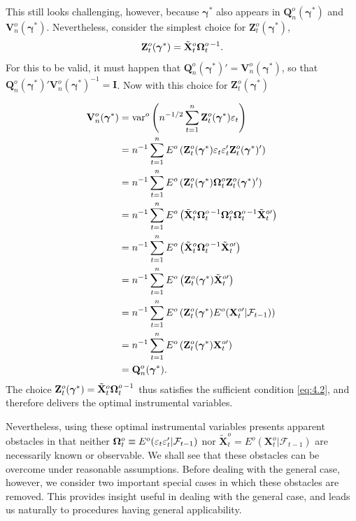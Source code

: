 This still looks challenging, however, because $\boldsymbol{\gamma}^*$ also appears in $\mathbf{Q}_n^o(\boldsymbol{\gamma}^*)$
and $\mathbf{V}_n^o(\boldsymbol{\gamma}^*)$. Nevertheless, consider the simplest choice for $\mathbf{Z}_t^o(\boldsymbol{\gamma}^*)$,
\[
\mathbf{Z}_t^o(\boldsymbol{\gamma}^*) = \tilde{\mathbf{X}}_t^o\boldsymbol{\Omega}_t^{o\,-1}.
\]
For this to be valid, it must happen that $\mathbf{Q}_n^o(\boldsymbol{\gamma}^*)' = \mathbf{V}_n^o(\boldsymbol{\gamma}^*)$, so that
$\mathbf{Q}_n^o(\boldsymbol{\gamma}^*)'\mathbf{V}_n^o(\boldsymbol{\gamma}^*)^{-1} = \mathbf{I}$. Now with this choice for $\mathbf{Z}_t^o(\boldsymbol{\gamma}^*)$

\begin{align*}
\mathbf{V}_n^o(\boldsymbol{\gamma}^*) &= \mathrm{var}^o\left(n^{-1/2}\sum_{t=1}^{n}\mathbf{Z}_t^o(\boldsymbol{\gamma}^*)\varepsilon_t\right) \\
&= n^{-1}\sum_{t=1}^{n}E^o\left(\mathbf{Z}_t^o(\boldsymbol{\gamma}^*)\varepsilon_t\varepsilon_t'\mathbf{Z}_t^o(\boldsymbol{\gamma}^*)'\right) \\
&= n^{-1}\sum_{t=1}^{n}E^o\left(\mathbf{Z}_t^o(\boldsymbol{\gamma}^*)\boldsymbol{\Omega}_t^o\mathbf{Z}_t^o(\boldsymbol{\gamma}^*)'\right) \\
&= n^{-1}\sum_{t=1}^{n}E^o\left(\tilde{\mathbf{X}}_t^o\boldsymbol{\Omega}_t^{o\,-1}\boldsymbol{\Omega}_t^o\boldsymbol{\Omega}_t^{o\,-1}\tilde{\mathbf{X}}_t^{o\prime}\right) \\
&= n^{-1}\sum_{t=1}^{n}E^o\left(\tilde{\mathbf{X}}_t^o\boldsymbol{\Omega}_t^{o\,-1}\tilde{\mathbf{X}}_t^{o\prime}\right) \\
&= n^{-1}\sum_{t=1}^{n}E^o\left(\mathbf{Z}_t^o(\boldsymbol{\gamma}^*)\tilde{\mathbf{X}}_t^{o\prime}\right) \\
&= n^{-1}\sum_{t=1}^{n}E^o\left(\mathbf{Z}_t^o(\boldsymbol{\gamma}^*)E^o(\mathbf{X}_t^{o\prime}|\mathcal{F}_{t-1})\right) \\
&= n^{-1}\sum_{t=1}^{n}E^o\left(\mathbf{Z}_t^o(\boldsymbol{\gamma}^*)\mathbf{X}_t^{o\prime}\right) \\
&= \mathbf{Q}_n^o(\boldsymbol{\gamma}^*).
\end{align*}
The choice $\mathbf{Z}_t^o(\boldsymbol{\gamma}^*) = \tilde{\mathbf{X}}_t^o\boldsymbol{\Omega}_t^{o\,-1}$ thus satisfies the sufficient condition \eqref{eq:4.2},
and therefore delivers the optimal instrumental variables.

Nevertheless, using these optimal instrumental variables presents apparent obstacles in that neither $\boldsymbol{\Omega}_t^o \equiv E^o(\varepsilon_t\varepsilon_t'|\mathcal{F}_{t-1})$ nor $\tilde{\mathbf{X}}_t^o = E^o(\mathbf{X}_t^o|\mathcal{F}_{t-1})$
are necessarily known or observable. We shall see that these obstacles can
be overcome under reasonable assumptions. Before dealing with the general
case, however, we consider two important special cases in which these obstacles are removed. This provides insight useful in dealing with the general
case, and leads us naturally to procedures having general applicability.

